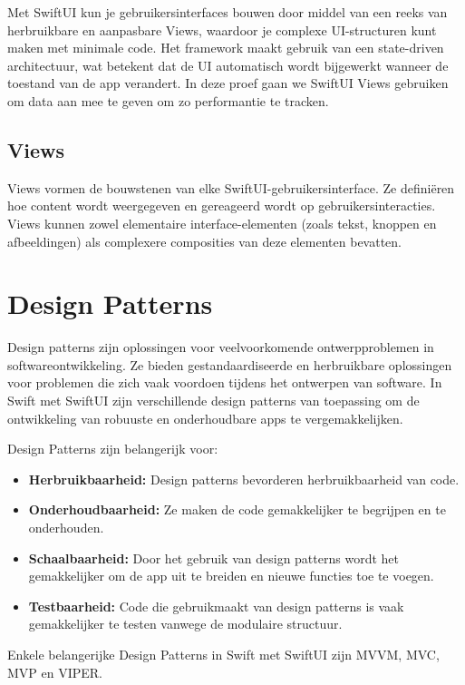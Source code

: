Met SwiftUI kun je gebruikersinterfaces bouwen door middel van een reeks van herbruikbare en aanpasbare Views, waardoor je complexe UI-structuren kunt maken met minimale code. Het framework maakt gebruik van een state-driven architectuur, wat betekent dat de UI automatisch wordt bijgewerkt wanneer de toestand van de app verandert. In deze proef gaan we SwiftUI Views gebruiken om data aan mee te geven om zo performantie te tracken.

\subsection{Views}
\autocite{AppleSwiftViews} Views vormen de bouwstenen van elke SwiftUI-gebruikersinterface. Ze definiëren hoe content wordt weergegeven en gereageerd wordt op gebruikersinteracties. Views kunnen zowel elementaire interface-elementen (zoals tekst, knoppen en afbeeldingen) als complexere composities van deze elementen bevatten.

\section{Design Patterns}
Design patterns zijn oplossingen voor veelvoorkomende ontwerpproblemen in softwareontwikkeling. Ze bieden gestandaardiseerde en herbruikbare oplossingen voor problemen die zich vaak voordoen tijdens het ontwerpen van software. In Swift met SwiftUI zijn verschillende design patterns van toepassing om de ontwikkeling van robuuste en onderhoudbare apps te vergemakkelijken.

Design Patterns zijn belangerijk voor:
\begin{itemize}
    \item {\textbf{Herbruikbaarheid:} Design patterns bevorderen herbruikbaarheid van code.}
    \item {\textbf{Onderhoudbaarheid:} Ze maken de code gemakkelijker te begrijpen en te onderhouden.}
    \item {\textbf{Schaalbaarheid:} Door het gebruik van design patterns wordt het gemakkelijker om de app uit te breiden en nieuwe functies toe te voegen.}
    \item {\textbf{Testbaarheid:} Code die gebruikmaakt van design patterns is vaak gemakkelijker te testen vanwege de modulaire structuur.}
\end{itemize}
\autocite{MediumPatterns} Enkele belangerijke Design Patterns in Swift met SwiftUI zijn MVVM, MVC, MVP en VIPER.

